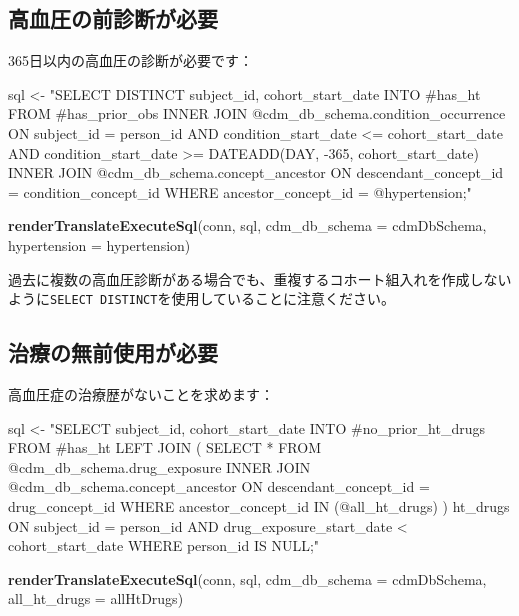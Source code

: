 \documentclass[
  11pt]{book}
\newenvironment{Shaded}{\begin{snugshade}}{\end{snugshade}}
\newcommand{\AttributeTok}[1]{\textcolor[rgb]{0.13,0.29,0.53}{#1}}
\newcommand{\FunctionTok}[1]{\textcolor[rgb]{0.13,0.29,0.53}{\textbf{#1}}}
\newcommand{\NormalTok}[1]{#1}
\newcommand{\OtherTok}[1]{\textcolor[rgb]{0.56,0.35,0.01}{#1}}
\newcommand{\StringTok}[1]{\textcolor[rgb]{0.31,0.60,0.02}{#1}}
\theoremstyle{definition}
\theoremstyle{definition}
\theoremstyle{definition}
\theoremstyle{definition}
\theoremstyle{remark}
\begin{document}
\subsection{高血圧の前診断が必要}\label{ux9ad8ux8840ux5727ux306eux524dux8a3aux65adux304cux5fc5ux8981}

365日以内の高血圧の診断が必要です：

\begin{Shaded}
\begin{Highlighting}[]
\NormalTok{sql }\OtherTok{\textless{}{-}} \StringTok{"SELECT DISTINCT subject\_id,}
\StringTok{  cohort\_start\_date}
\StringTok{INTO \#has\_ht}
\StringTok{FROM \#has\_prior\_obs}
\StringTok{INNER JOIN @cdm\_db\_schema.condition\_occurrence}
\StringTok{  ON subject\_id = person\_id}
\StringTok{    AND condition\_start\_date \textless{}= cohort\_start\_date}
\StringTok{    AND condition\_start\_date \textgreater{}= DATEADD(DAY, {-}365, cohort\_start\_date)}
\StringTok{INNER JOIN @cdm\_db\_schema.concept\_ancestor}
\StringTok{  ON descendant\_concept\_id = condition\_concept\_id}
\StringTok{WHERE ancestor\_concept\_id = @hypertension;"}

\FunctionTok{renderTranslateExecuteSql}\NormalTok{(conn,}
\NormalTok{                          sql,}
                          \AttributeTok{cdm\_db\_schema =}\NormalTok{ cdmDbSchema,}
                          \AttributeTok{hypertension =}\NormalTok{ hypertension)}
\end{Highlighting}
\end{Shaded}

過去に複数の高血圧診断がある場合でも、重複するコホート組入れを作成しないように\texttt{SELECT\ DISTINCT}を使用していることに注意ください。

\subsection{治療の無前使用が必要}\label{ux6cbbux7642ux306eux7121ux524dux4f7fux7528ux304cux5fc5ux8981}

高血圧症の治療歴がないことを求めます：

\begin{Shaded}
\begin{Highlighting}[]
\NormalTok{sql }\OtherTok{\textless{}{-}} \StringTok{"SELECT subject\_id,}
\StringTok{  cohort\_start\_date}
\StringTok{INTO \#no\_prior\_ht\_drugs}
\StringTok{FROM \#has\_ht}
\StringTok{LEFT JOIN (}
\StringTok{  SELECT *}
\StringTok{  FROM @cdm\_db\_schema.drug\_exposure}
\StringTok{  INNER JOIN @cdm\_db\_schema.concept\_ancestor}
\StringTok{    ON descendant\_concept\_id = drug\_concept\_id}
\StringTok{  WHERE ancestor\_concept\_id IN (@all\_ht\_drugs)}
\StringTok{) ht\_drugs}
\StringTok{  ON subject\_id = person\_id}
\StringTok{    AND drug\_exposure\_start\_date \textless{} cohort\_start\_date}
\StringTok{WHERE person\_id IS NULL;"}

\FunctionTok{renderTranslateExecuteSql}\NormalTok{(conn,}
\NormalTok{                          sql,}
                          \AttributeTok{cdm\_db\_schema =}\NormalTok{ cdmDbSchema,}
                          \AttributeTok{all\_ht\_drugs =}\NormalTok{ allHtDrugs)}
\end{Highlighting}
\end{Shaded}
\end{document}
